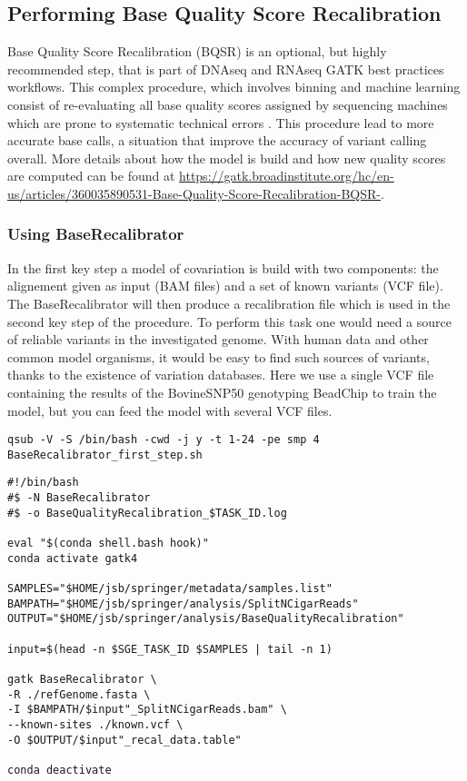 \subsection{Performing Base Quality Score Recalibration}

Base Quality Score Recalibration (BQSR) is an optional, but highly recommended step, that is part of DNAseq and RNAseq GATK best practices workflows. This complex procedure, which involves binning and machine learning consist of re-evaluating all base quality scores assigned by sequencing machines which are prone to systematic technical errors \cite{GATK_BaseQuality}. This procedure lead to more accurate base calls, a situation that improve the accuracy of variant calling overall. More details about how the model is build and how new quality scores are computed can be found at \href{https://gatk.broadinstitute.org/hc/en-us/articles/360035890531-Base-Quality-Score-Recalibration-BQSR-}{https://gatk.broadinstitute.org/hc/en-us/articles/360035890531-Base-Quality-Score-Recalibration-BQSR-}.

\subsubsection{Using BaseRecalibrator}

In the first key step  a model of covariation is build with two components: the alignement given as input (BAM files) and a set of known variants (VCF file). The BaseRecalibrator will then produce a recalibration file which is used in the second key step of the procedure. To perform this task one would need a source of reliable variants in the investigated genome. With human data and other common model organisms, it would be easy to find such sources of variants, thanks to the existence of variation databases. Here we use a single VCF file containing the results of the BovineSNP50 genotyping BeadChip to train the model, but you can feed the model with several VCF files.



\begin{verbatim}
qsub -V -S /bin/bash -cwd -j y -t 1-24 -pe smp 4  BaseRecalibrator_first_step.sh
\end{verbatim}



\begin{verbatim}
#!/bin/bash
#$ -N BaseRecalibrator
#$ -o BaseQualityRecalibration_$TASK_ID.log

eval "$(conda shell.bash hook)"
conda activate gatk4

SAMPLES="$HOME/jsb/springer/metadata/samples.list"
BAMPATH="$HOME/jsb/springer/analysis/SplitNCigarReads"
OUTPUT="$HOME/jsb/springer/analysis/BaseQualityRecalibration"

input=$(head -n $SGE_TASK_ID $SAMPLES | tail -n 1)

gatk BaseRecalibrator \
-R ./refGenome.fasta \
-I $BAMPATH/$input"_SplitNCigarReads.bam" \
--known-sites ./known.vcf \
-O $OUTPUT/$input"_recal_data.table"

conda deactivate
\end{verbatim}






